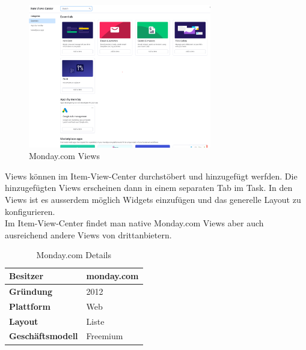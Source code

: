 \begin{figure}[H]
    \begin{center}
        \includegraphics[width=8cm]{../content/images/monday.com/MondayItemViewsCenter.png}
        \caption{Monday.com Views}
    \end{center}
\end{figure}

Views können im Item-View-Center durchstöbert und hinzugefügt werfden. 
Die hinzugefügten Views erscheinen dann in einem separaten Tab im Task. In den Views ist es ausserdem möglich Widgets einzufügen
und das generelle Layout zu konfigurieren.\\
Im Item-View-Center findet man native Monday.com Views aber auch ausreichend andere Views von drittanbietern.

\begin{table}[H]
    \centering
    \settowidth{}
    \setlength\extrarowheight{2pt}
    \begin{tabulary}{1.0\textwidth}{|L|L|}
      \hline
      \textbf{Besitzer} &
      monday.com\\
      \hline
      \textbf{Gründung} &
      2012\\
      \hline
      \textbf{Plattform} &
      Web\\
      \hline
      \textbf{Layout} &
      Liste\\
      \hline
      \textbf{Geschäftsmodell} &
      Freemium\\
      \hline
    \end{tabulary}
    \caption{Monday.com Details}
  \end{table}

